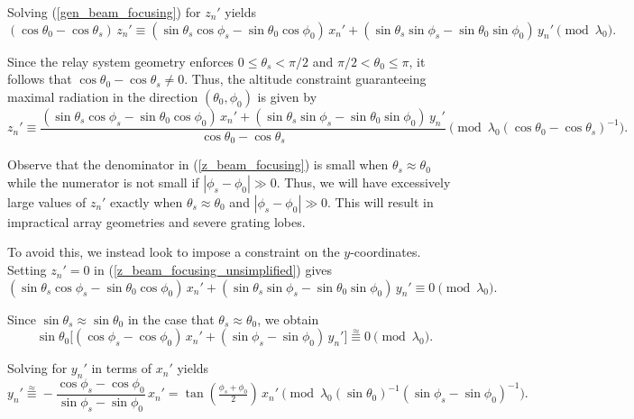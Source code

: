 \documentclass[11pt,letterpaper]{article}
\theoremstyle{definition}
\theoremstyle{plain}
\begin{document}
Solving (\ref{gen_beam_focusing}) for $z_n'$ yields
\begin{equation}
\label{z_beam_focusing_unsimplified}
(\cos\theta_0 - \cos\theta_s)\, z_n' \equiv 
(\sin\theta_s\cos\phi_s - \sin\theta_0\cos\phi_0)\,x_n' 
+ (\sin\theta_s\sin\phi_s - \sin\theta_0\sin\phi_0)\,y_n' 
\pmod{\lambda_0}.
\end{equation}

Since the relay system geometry enforces $0 \leq \theta_s < \pi/2$ and $\pi/2 < \theta_0 \leq \pi$, it follows that 
$\cos\theta_0 - \cos\theta_s \neq 0$. Thus, the altitude constraint guaranteeing maximal radiation in the direction $(\theta_0,\phi_0)$ is given by
\begin{equation}
\label{z_beam_focusing}
z_n' \equiv  
\frac{ (\sin\theta_s\cos\phi_s - \sin\theta_0\cos\phi_0)\,x_n' 
     + (\sin\theta_s\sin\phi_s - \sin\theta_0\sin\phi_0)\,y_n'}
{\cos\theta_0 - \cos\theta_s}
\pmod{\lambda_0(\cos\theta_0 - \cos\theta_s)^{-1}}.
\end{equation}


Observe that  the denominator in (\ref{z_beam_focusing}) is small when $\theta_s \approx \theta_0$ while the numerator is not small if $|\phi_s - \phi_0| \gg 0$. Thus, we will have excessively large values of $z_n'$ exactly when $\theta_s \approx \theta_0$ and $|\phi_s - \phi_0| \gg 0$. This will result in impractical array geometries and severe grating lobes.

To avoid this, we instead look to impose a constraint on the $y$-coordinates. Setting $z_n'=0$ in (\ref{z_beam_focusing_unsimplified}) gives
\begin{equation}
\label{alt_y_constraint}
(\sin\theta_s\cos\phi_s - \sin\theta_0\cos\phi_0)\,x_n' 
+ (\sin\theta_s\sin\phi_s - \sin\theta_0\sin\phi_0)\,y_n' 
\equiv 0 \pmod{\lambda_0}.
\end{equation}

Since $\sin\theta_s \approx \sin\theta_0$ in the case that $\theta_s \approx \theta_0$, we obtain
\begin{equation}
\sin\theta_0\big[(\cos\phi_s - \cos\phi_0)\,x_n' 
+ (\sin\phi_s - \sin\phi_0)\,y_n'\big] 
\stackrel{\approx}{\equiv} 0 \pmod{\lambda_0}.
\end{equation}

Solving for $y_n'$ in terms of $x_n'$ yields
\begin{equation}
y_n' \stackrel{\approx}{\equiv} 
-\frac{\cos\phi_s - \cos\phi_0}{\sin\phi_s - \sin\phi_0}\,x_n' 
= \tan\!\left(\tfrac{\phi_s+\phi_0}{2}\right)\,x_n' 
\pmod{\lambda_0(\sin\theta_0)^{-1}(\sin\phi_s - \sin\phi_0)^{-1}}.
\end{equation}
\end{document}
